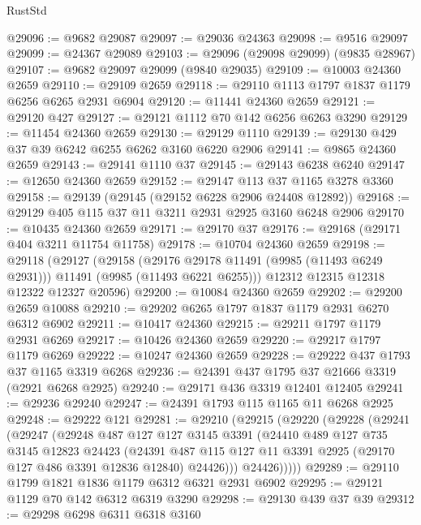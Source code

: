 \begin{lexlean}{RustStd}
\begin{coremodule}
@29096 := @9682 @29087
@29097 := @29036 @24363
@29098 := @9516 @29097
@29099 := @24367 @29089
@29103 := @29096 (@29098 @29099) (@9835 @28967)
@29107 := @9682 @29097 @29099 (@9840 @29035)
@29109 := @10003 @24360 @2659
@29110 := @29109 @2659
@29118 := @29110 @1113 @1797 @1837 @1179 @6256 @6265 @2931 @6904
@29120 := @11441 @24360 @2659
@29121 := @29120 @427
@29127 := @29121 @1112 @70 @142 @6256 @6263 @3290
@29129 := @11454 @24360 @2659
@29130 := @29129 @1110
@29139 := @29130 @429 @37 @39 @6242 @6255 @6262 @3160 @6220 @2906
@29141 := @9865 @24360 @2659
@29143 := @29141 @1110 @37
@29145 := @29143 @6238 @6240
@29147 := @12650 @24360 @2659
@29152 := @29147 @113 @37 @1165 @3278 @3360
@29158 := @29139 (@29145 (@29152 @6228 @2906 @24408 @12892))
@29168 := @29129 @405 @115 @37 @11 @3211 @2931 @2925 @3160 @6248 @2906
@29170 := @10435 @24360 @2659
@29171 := @29170 @37
@29176 := @29168 (@29171 @404 @3211 @11754 @11758)
@29178 := @10704 @24360 @2659
@29198 := @29118
    (@29127
      (@29158
        (@29176 @29178 @11491 (@9985 (@11493 @6249 @2931)))
        @11491
        (@9985 (@11493 @6221 @6255)))
      @12312
      @12315
      @12318
      @12322
      @12327
      @20596)
@29200 := @10084 @24360 @2659
@29202 := @29200 @2659 @10088
@29210 := @29202 @6265 @1797 @1837 @1179 @2931 @6270 @6312 @6902
@29211 := @10417 @24360
@29215 := @29211 @1797 @1179 @2931 @6269
@29217 := @10426 @24360 @2659
@29220 := @29217 @1797 @1179 @6269
@29222 := @10247 @24360 @2659
@29228 := @29222 @437 @1793 @37 @1165 @3319 @6268
@29236 := @24391 @437 @1795 @37 @21666 @3319 (@2921 @6268 @2925)
@29240 := @29171 @436 @3319 @12401 @12405
@29241 := @29236 @29240
@29247 := @24391 @1793 @115 @1165 @11 @6268 @2925
@29248 := @29222 @121
@29281 := @29210
    (@29215
      (@29220
        (@29228
          (@29241
            (@29247
              (@29248
                @487
                @127
                @127
                @3145
                @3391
                (@24410
                  @489
                  @127
                  @735
                  @3145
                  @12823
                  @24423
                  (@24391
                    @487
                    @115
                    @127
                    @11
                    @3391
                    @2925
                    (@29170 @127 @486 @3391 @12836 @12840)
                    @24426)))
              @24426)))))
@29289 := @29110 @1799 @1821 @1836 @1179 @6312 @6321 @2931 @6902
@29295 := @29121 @1129 @70 @142 @6312 @6319 @3290
@29298 := @29130 @439 @37 @39
@29312 := @29298
    @6298
    @6311
    @6318
    @3160

\end{coremodule}
\end{lexlean}
